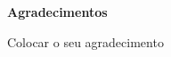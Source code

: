 \begin{flushright}
    \vspace*{72pt}
    \fontsize{16}{16}\selectfont \textbf{Agradecimentos}
    \vspace{60pt}
\end{flushright}

Colocar o seu agradecimento
